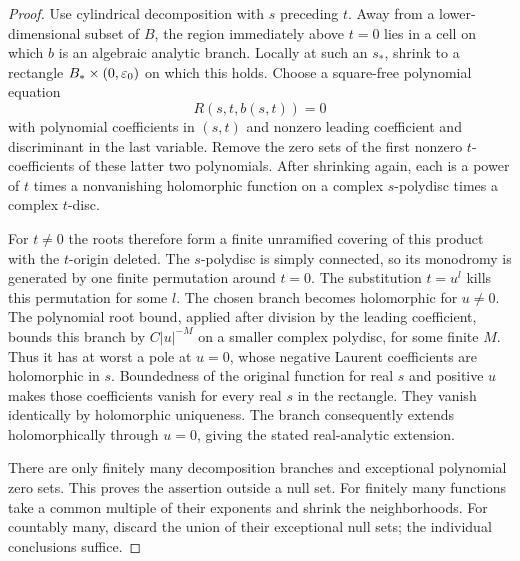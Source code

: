 \begin{proof}
Use cylindrical decomposition with $s$ preceding $t$.  Away from a
lower-dimensional subset of $B$, the region immediately above $t=0$
lies in a cell on which $b$ is an algebraic analytic branch.  Locally at
such an $s_*$, shrink to a rectangle $B_*\times(0,\varepsilon_0)$ on which
this holds.  Choose a square-free polynomial equation
\[
 R(s,t,b(s,t))=0
\]
with polynomial coefficients in $(s,t)$ and nonzero leading coefficient
and discriminant in the last variable.  Remove the zero sets of the
first nonzero $t$-coefficients of these latter two polynomials.  After
shrinking again, each is a power of $t$ times a nonvanishing holomorphic
function on a complex $s$-polydisc times a complex $t$-disc.

For $t\ne0$ the roots therefore form a finite unramified covering of
this product with the $t$-origin deleted.  The $s$-polydisc is simply
connected, so its monodromy is generated by one finite permutation around
$t=0$.  The substitution $t=u^l$ kills this permutation for some $l$.
The chosen branch becomes holomorphic for $u\ne0$.  The polynomial root
bound, applied after division by the leading coefficient, bounds this
branch by $C|u|^{-M}$ on a smaller complex polydisc, for some finite $M$.
Thus it has at worst a pole at $u=0$, whose negative Laurent coefficients
are holomorphic in $s$.  Boundedness of the original function for real
$s$ and positive $u$ makes those coefficients vanish for every real $s$
in the rectangle.  They vanish identically by holomorphic uniqueness.
The branch consequently extends holomorphically through $u=0$, giving
the stated real-analytic extension.

There are only finitely many decomposition branches and exceptional
polynomial zero sets.  This proves the assertion outside a null set.
For finitely many functions take a common multiple of their exponents
and shrink the neighborhoods.  For countably many, discard the union
of their exceptional null sets; the individual conclusions suffice.
\end{proof}

